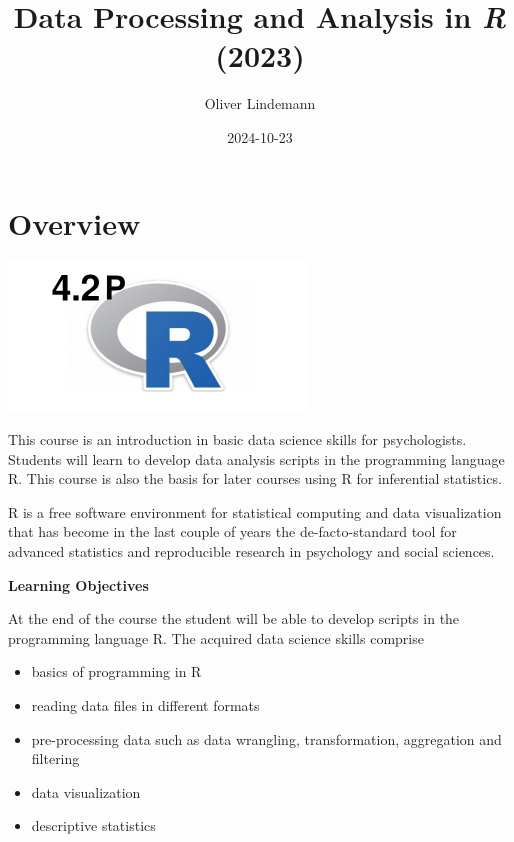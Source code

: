 \documentclass[
]{scrartcl}
\title{Data Processing and Analysis in \emph{R} (2023)}
\author{Oliver Lindemann}
\date{2024-10-23}
\providecommand{\tightlist}{%
  \setlength{\itemsep}{0pt}\setlength{\parskip}{0pt}}
\begin{document}
\maketitle

{
\hypersetup{linkcolor=}
\setcounter{tocdepth}{2}
\tableofcontents
}
\newpage

\section*{Overview}\label{overview}

\begin{center}\includegraphics[width=300px]{images/R-course-logo} \end{center}

This course is an introduction in basic data science skills for psychologists. Students will learn to develop data analysis scripts in the programming language R. This course is also the basis for later courses using R for inferential statistics.

R is a free software environment for statistical computing and data visualization that has become in the last couple of years the de-facto-standard tool for advanced statistics and reproducible research in psychology and social sciences.

\textbf{Learning Objectives}

At the end of the course the student will be able to develop scripts in the programming language R. The acquired data science skills comprise

\begin{itemize}
\tightlist
\item
  basics of programming in R
\item
  reading data files in different formats
\item
  pre-processing data such as data wrangling, transformation, aggregation and filtering
\item
  data visualization
\item
  descriptive statistics
\end{itemize}
\end{document}

